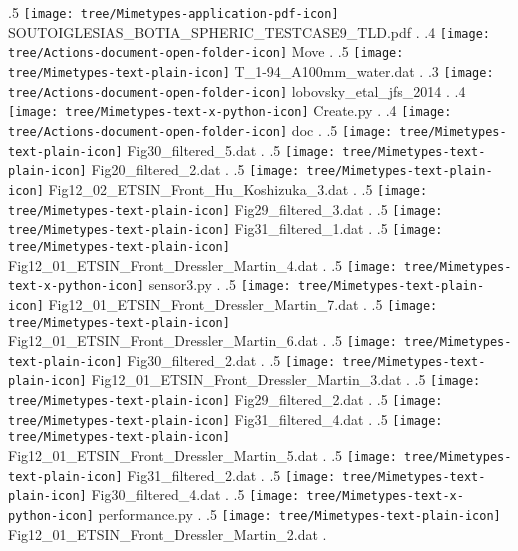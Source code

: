 {.5 { \texttt{[image: tree/Mimetypes-application-pdf-icon]} SOUTOIGLESIAS\_BOTIA\_SPHERIC\_TESTCASE9\_TLD.pdf }.
.4 { \texttt{[image: tree/Actions-document-open-folder-icon]} Move }.
.5 { \texttt{[image: tree/Mimetypes-text-plain-icon]} T\_1-94\_A100mm\_water.dat }.
.3 { \texttt{[image: tree/Actions-document-open-folder-icon]} lobovsky\_etal\_jfs\_2014 }.
.4 { \texttt{[image: tree/Mimetypes-text-x-python-icon]} Create.py }.
.4 { \texttt{[image: tree/Actions-document-open-folder-icon]} doc }.
.5 { \texttt{[image: tree/Mimetypes-text-plain-icon]} Fig30\_filtered\_5.dat }.
.5 { \texttt{[image: tree/Mimetypes-text-plain-icon]} Fig20\_filtered\_2.dat }.
.5 { \texttt{[image: tree/Mimetypes-text-plain-icon]} Fig12\_02\_ETSIN\_Front\_Hu\_Koshizuka\_3.dat }.
.5 { \texttt{[image: tree/Mimetypes-text-plain-icon]} Fig29\_filtered\_3.dat }.
.5 { \texttt{[image: tree/Mimetypes-text-plain-icon]} Fig31\_filtered\_1.dat }.
.5 { \texttt{[image: tree/Mimetypes-text-plain-icon]} Fig12\_01\_ETSIN\_Front\_Dressler\_Martin\_4.dat }.
.5 { \texttt{[image: tree/Mimetypes-text-x-python-icon]} sensor3.py }.
.5 { \texttt{[image: tree/Mimetypes-text-plain-icon]} Fig12\_01\_ETSIN\_Front\_Dressler\_Martin\_7.dat }.
.5 { \texttt{[image: tree/Mimetypes-text-plain-icon]} Fig12\_01\_ETSIN\_Front\_Dressler\_Martin\_6.dat }.
.5 { \texttt{[image: tree/Mimetypes-text-plain-icon]} Fig30\_filtered\_2.dat }.
.5 { \texttt{[image: tree/Mimetypes-text-plain-icon]} Fig12\_01\_ETSIN\_Front\_Dressler\_Martin\_3.dat }.
.5 { \texttt{[image: tree/Mimetypes-text-plain-icon]} Fig29\_filtered\_2.dat }.
.5 { \texttt{[image: tree/Mimetypes-text-plain-icon]} Fig31\_filtered\_4.dat }.
.5 { \texttt{[image: tree/Mimetypes-text-plain-icon]} Fig12\_01\_ETSIN\_Front\_Dressler\_Martin\_5.dat }.
.5 { \texttt{[image: tree/Mimetypes-text-plain-icon]} Fig31\_filtered\_2.dat }.
.5 { \texttt{[image: tree/Mimetypes-text-plain-icon]} Fig30\_filtered\_4.dat }.
.5 { \texttt{[image: tree/Mimetypes-text-x-python-icon]} performance.py }.
.5 { \texttt{[image: tree/Mimetypes-text-plain-icon]} Fig12\_01\_ETSIN\_Front\_Dressler\_Martin\_2.dat }.
}
